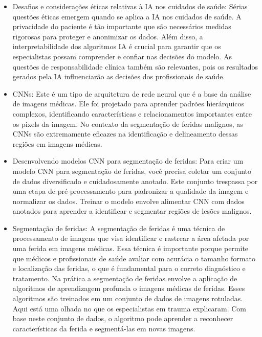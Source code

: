 \begin{itemize}

    \item Desafios e considerações éticas relativas à \ac{IA} nos cuidados de saúde: Sérias questões éticas emergem quando se aplica a \ac{IA} nos cuidados de saúde. A privacidade do paciente é tão importante que são necessários medidas rigorosas para proteger e anonimizar os dados. Além disso, a interpretabilidade dos algoritmos \ac{IA} é crucial para garantir que os especialistas possam comprender e confiar nas decisões do modelo. As questões de responsabilidade clínica também são relevantes, pois os resultados gerados pela \ac{IA} influenciarão as decisões dos profissionais de saúde.

    \item \ac{CNNs}: Este é um tipo de arquitetura de rede neural que é a base da análise de imagens médicas. Ele foi projetado para aprender padrões hierárquicos complexos, identificando características e relacionamentos importantes entre os pixels da imagem. No contexto da segmentação de feridas malignos, as \ac{CNNs} são extremamente eficazes na identificação e delineamento dessas regiões em imagens médicas.

    \item Desenvolvendo modelos \ac{CNN} para segmentação de feridas: Para criar um modelo \ac{CNN} para segmentação de feridas, você precisa coletar um conjunto de dados diversificado e cuidadosamente anotado. Este conjunto trespassa por uma etapa de pré-processamento para padronizar a qualidade da imagem e normalizar os dados. Treinar o modelo envolve alimentar \ac{CNN} com dados anotados para aprender a identificar e segmentar regiões de lesões malignos.

    \item Segmentação de feridas: A segmentação de feridas é uma técnica de processamento de imagens que visa identificar e rastrear a área afetada por uma ferida em imagens médicas. Essa técnica é importante porque permite que médicos e profissionais de saúde avaliar com acurácia o tamanho formato e localização das feridas, o que é fundamental para o correto diagnóstico e tratamento. Na prática a segmentação de feridas envolve a aplicação de algoritmos de aprendizagem profunda o imagens médicas de feridas. Esses algoritmos são treinados em um conjunto de dados de imagens rotuladas. Aqui está uma olhada no que os especialistas em trauma explicaram. Com base neste conjunto de dados, o algoritmo pode aprender a reconhecer características da ferida e segmentá-las em novas imagens.


\end{itemize}
